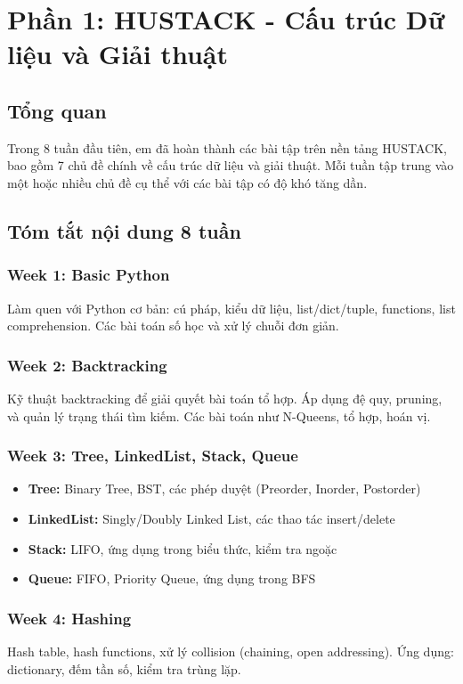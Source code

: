 \documentclass[12pt,a4paper]{article}
\begin{document}
\newpage
\section{Phần 1: HUSTACK - Cấu trúc Dữ liệu và Giải thuật}

\subsection{Tổng quan}
Trong 8 tuần đầu tiên, em đã hoàn thành các bài tập trên nền tảng HUSTACK, bao gồm 7 chủ đề chính về cấu trúc dữ liệu và giải thuật. Mỗi tuần tập trung vào một hoặc nhiều chủ đề cụ thể với các bài tập có độ khó tăng dần.

\subsection{Tóm tắt nội dung 8 tuần}

\subsubsection{Week 1: Basic Python}
Làm quen với Python cơ bản: cú pháp, kiểu dữ liệu, list/dict/tuple, functions, list comprehension. Các bài toán số học và xử lý chuỗi đơn giản.

\subsubsection{Week 2: Backtracking}
Kỹ thuật backtracking để giải quyết bài toán tổ hợp. Áp dụng đệ quy, pruning, và quản lý trạng thái tìm kiếm. Các bài toán như N-Queens, tổ hợp, hoán vị.

\subsubsection{Week 3: Tree, LinkedList, Stack, Queue}
\begin{itemize}
    \item \textbf{Tree:} Binary Tree, BST, các phép duyệt (Preorder, Inorder, Postorder)
    \item \textbf{LinkedList:} Singly/Doubly Linked List, các thao tác insert/delete
    \item \textbf{Stack:} LIFO, ứng dụng trong biểu thức, kiểm tra ngoặc
    \item \textbf{Queue:} FIFO, Priority Queue, ứng dụng trong BFS
\end{itemize}

\subsubsection{Week 4: Hashing}
Hash table, hash functions, xử lý collision (chaining, open addressing). Ứng dụng: dictionary, đếm tần số, kiểm tra trùng lặp.
\end{document}
